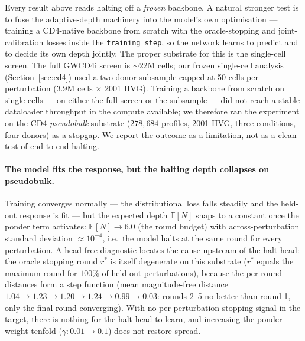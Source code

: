\documentclass[11pt]{article}
\newcommand{\EN}{\ensuremath{\mathbb{E}[N]}}
\begin{document}
Every result above reads halting off a \emph{frozen} backbone. A natural stronger test is to fuse
the adaptive-depth machinery into the model's own optimisation --- training a CD4-native backbone
from scratch with the oracle-stopping and joint-calibration losses inside the
\texttt{training\_step}, so the network learns to predict and to decide its own depth jointly. The
proper substrate for this is the single-cell screen. The full GWCD4i screen is $\sim$22M cells; our
frozen single-cell analysis (Section~\ref{sec:cd4}) used a two-donor subsample capped at 50 cells per
perturbation ($3.9$M cells $\times$ 2001 HVG). Training a backbone from scratch on single cells --- on
either the full screen or the subsample --- did not reach a stable dataloader throughput in the compute
available; we therefore ran the experiment on the CD4 \emph{pseudobulk} substrate
($278{,}684$ profiles, 2001 HVG, three conditions, four donors) as a stopgap. We report the
outcome as a limitation, not as a clean test of end-to-end halting.

\paragraph{The model fits the response, but the halting depth collapses on pseudobulk.} Training
converges normally --- the distributional loss falls steadily and the held-out response is fit ---
but the expected depth \EN{} snaps to a constant once the ponder term activates: \EN{}$\to6.0$ (the
round budget) with across-perturbation standard deviation $\approx10^{-4}$, i.e.\ the model halts at
the same round for every perturbation. A head-free diagnostic locates the cause upstream of the halt
head: the oracle stopping round $r^\ast$ is itself degenerate on this substrate ($r^\ast$ equals the
maximum round for $100\%$ of held-out perturbations), because the per-round distances form a
step function (mean magnitude-free distance $1.04\to1.23\to1.20\to1.24\to0.99\to0.03$: rounds 2--5 no
better than round 1, only the final round converging). With no per-perturbation stopping signal in
the target, there is nothing for the halt head to learn, and increasing the ponder weight tenfold
($\gamma:0.01\to0.1$) does not restore spread.
\end{document}
